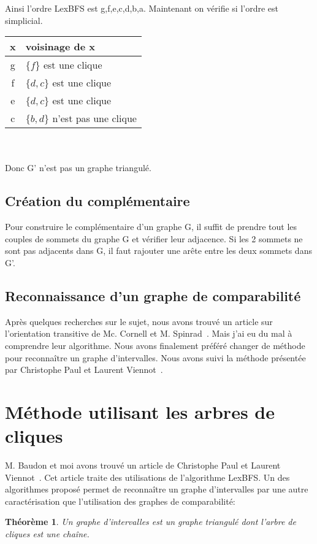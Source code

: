 \documentclass[12pt, a4paper]{report}
\newtheorem{theorem}{Théorème}
\begin{document}
  Ainsi l'ordre LexBFS est g,f,e,c,d,b,a. Maintenant on vérifie si l'ordre est simplicial.\\
 
 \begin{tabular}{| c | l |}
 \hline
    x & voisinage de x  \\
    \hline
    g & $\{f\}$ est une clique\\
    f & $\{d,c\}$ est une clique\\ 
    e & $\{d,c\}$ est une clique \\
    c & $\{b,d\}$ n'est pas une clique \\ 
    \hline
 \end{tabular}\\\\
 
 
 	Donc G' n'est  pas un graphe triangulé.\\
 
	\subsection{Création du complémentaire}
	 
	 Pour construire le complémentaire d'un graphe G, il suffit de prendre tout les couples de sommets du graphe G et vérifier leur adjacence. Si les 2 sommets ne sont pas adjacents dans G, il faut rajouter une arête entre les deux sommets dans G'.


	\subsection{Reconnaissance d'un graphe de comparabilité}
	
		Après quelques recherches sur le sujet, nous avons trouvé un article sur l'orientation transitive de Mc. Cornell et M. Spinrad~\cite{CS97}. Mais j'ai eu du mal à comprendre leur algorithme. Nous avons finalement préféré changer de méthode pour reconnaître un graphe d'intervalles. Nous avons suivi la méthode présentée par Christophe Paul et Laurent Viennot~\cite{PV}.
	

\section{Méthode utilisant les arbres de cliques}

	M. Baudon et moi avons trouvé un article de Christophe Paul et Laurent Viennot~\cite{PV}. Cet article traite des utilisations de l'algorithme LexBFS. Un des algorithmes proposé permet de reconnaître un graphe d'intervalles par une autre caractérisation que l'utilisation des graphes de comparabilité:
	\begin{theorem}
	Un graphe d'intervalles est  un graphe triangulé dont l'arbre de cliques est une chaîne.~\cite{PV}
	\end{theorem}
	
\end{document}
